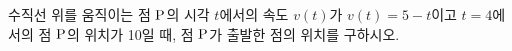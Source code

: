 수직선 위를 움직이는 점 $\mathrm{P}$의 시각 $t$에서의 속도 $v(t)$가 $v(t)=5-t$이고 $t=4$에서의 점 $\mathrm{P}$의 위치가 10일 때, 점 $\mathrm{P}$가 출발한 점의 위치를 구하시오.
